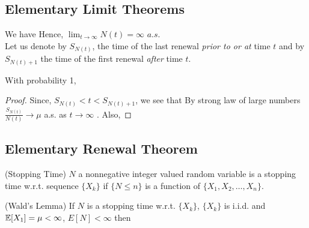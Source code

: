 \documentclass[all-lectures.tex]{subfiles}
\author{}
\begin{document}
\setcounter{chapter}{2}
\setcounter{section}{2}
\section*{}

\subsection{Elementary Limit Theorems}
We have 
Hence, $\lim_{t\to\infty} N(t) = \infty$ $a.s$. \\
\indent Let us denote by $S_{N(t)}$, the time of the last renewal \textit{prior to or at} time $t$ and by $S_{N(t)+1}$ the time of the first renewal \textit{after} time $t$.
\begin{prop}
With probability 1,
\end{prop}
\begin{proof}
Since, $S_{N(t)} < t < S_{N(t)+1}$, we see that
By strong law of large numbers $\frac{S_{N(t)}}{N(t)} \to \mu$ a.s. as $t \to \infty$ . Also,
 \qedhere
\end{proof}

\subsection{Elementary Renewal Theorem}
\begin{defn}
(Stopping Time)
$N$ a nonnegative integer valued random variable is a stopping time w.r.t. sequence $\{X_k\}$ if $\{ N\le n\}$ is a function of $\{X_{1}, X_{2}, \dots, X_n\}$.
\end{defn}
\begin{thm}
(Wald's Lemma)
If $N$ is a stopping time w.r.t. $\{X_k\}$, $\{X_k\}$ is i.i.d. and $\mathbb{E}[X_1] = \mu < \infty$, $E[N] < \infty$ then
\end{thm}
\end{document}
